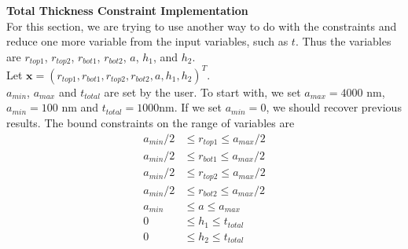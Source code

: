\documentclass[12pt]{article}
\numberwithin{equation}{section}
\newcommand{\red}[1]{\textcolor{red}{[#1]}} %
\numberwithin{equation}{section}
\begin{document}
\begin{outline}[enumerate]

\1 \textbf{Total Thickness Constraint Implementation} \\
For this section, we are trying to use another way to do with the constraints and reduce one more variable from the input variables, such as $t$.  
Thus the variables are $r_{top1}$, $r_{top2}$, $r_{bot1}$, $r_{bot2}$, $a$, $h_1$, and $h_2$. \\
Let $\mathbf{x} = \left ( r_{top1}, r_{bot1}, r_{top2}, r_{bot2}, a, h_1, h_2  \right )^T $. \\
$a_{min}$, $a_{max}$ and $t_{total}$ are set by the user.   To start with, we set $a_{max} = 4000$ nm, $a_{min} = 100$ nm and $t_{total} = 1000$nm.  If we set $a_{min} = 0$, we should recover previous results.
The bound constraints on the range of variables are
\begin{align*}
a_{min}/2 & \leq r_{top1} \leq a_{max}/2 \\
a_{min}/2 & \leq r_{bot1} \leq a_{max}/2 \\
a_{min}/2 & \leq r_{top2} \leq a_{max}/2 \\
a_{min}/2 & \leq r_{bot2} \leq a_{max}/2 \\
a_{min} & \leq a \leq a_{max} \\
0 & \leq h_1 \leq t_{total} \\
0 & \leq h_2 \leq t_{total}
\end{align*}


\end{outline}
\end{document}
